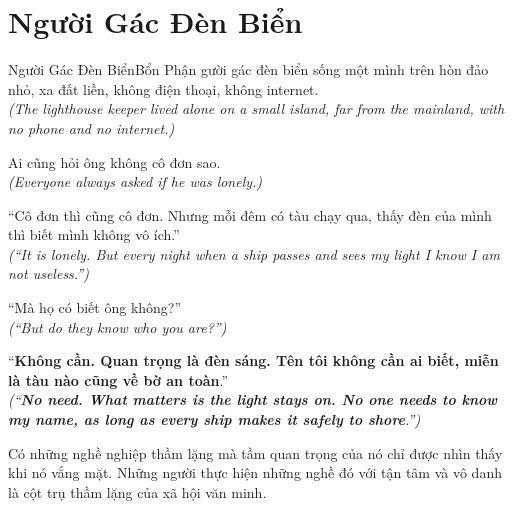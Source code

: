 \section{Người Gác Đèn Biển}
\begin{truyen}{Người Gác Đèn Biển}{Bổn Phận}
gười gác đèn biển sống một mình trên hòn đảo nhỏ, xa đất liền, không điện thoại, không internet.\\
\textit{(The lighthouse keeper lived alone on a small island, far from the mainland, with no phone and no internet.)}

Ai cũng hỏi ông không cô đơn sao.\\
\textit{(Everyone always asked if he was lonely.)}

``Cô đơn thì cũng cô đơn. Nhưng mỗi đêm có tàu chạy qua, thấy đèn của mình thì biết mình không vô ích.''\\
\textit{(``It is lonely. But every night when a ship passes and sees my light I know I am not useless.'')}

``Mà họ có biết ông không?''\\
\textit{(``But do they know who you are?'')}

``\textbf{Không cần. Quan trọng là đèn sáng. Tên tôi không cần ai biết, miễn là tàu nào cũng về bờ an toàn}.''\\
\textit{(``\textbf{No need. What matters is the light stays on. No one needs to know my name, as long as every ship makes it safely to shore}.'')}
\end{truyen}
\begin{baihoc}
  Có những nghề nghiệp thầm lặng mà tầm quan trọng của nó chỉ được nhìn thấy khi nó vắng mặt. Những người thực hiện những nghề đó với tận tâm và vô danh là cột trụ thầm lặng của xã hội văn minh.
\end{baihoc}
